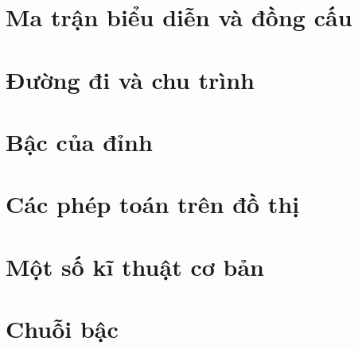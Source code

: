 \documentclass[14pt]{extarticle}
\begin{document}
\section{Ma trận biểu diễn và đồng cấu}
\section{Đường đi và chu trình}
\section{Bậc của đỉnh}
\section{Các phép toán trên đồ thị}
\section{Một số kĩ thuật cơ bản}
\section{Chuỗi bậc}
\end{document}
